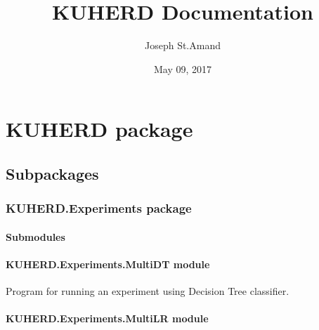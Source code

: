 \documentclass[letterpaper,10pt,english]{sphinxmanual}
\title{KUHERD Documentation}
\date{May 09, 2017}
\author{Joseph St.Amand}
\begin{document}
\maketitle
\sphinxtableofcontents
{}\label{\detokenize{index::doc}}



\chapter{KUHERD package}
\label{\detokenize{KUHERD::doc}}\label{\detokenize{KUHERD:welcome-to-kuherd-s-documentation}}\label{\detokenize{KUHERD:kuherd-package}}

\section{Subpackages}
\label{\detokenize{KUHERD:subpackages}}

\subsection{KUHERD.Experiments package}
\label{\detokenize{KUHERD.Experiments::doc}}\label{\detokenize{KUHERD.Experiments:kuherd-experiments-package}}

\subsubsection{Submodules}
\label{\detokenize{KUHERD.Experiments:submodules}}

\subsubsection{KUHERD.Experiments.MultiDT module}
\label{\detokenize{KUHERD.Experiments:module-KUHERD.Experiments.MultiDT}}\label{\detokenize{KUHERD.Experiments:kuherd-experiments-multidt-module}}

\begin{fulllineitems}
\label{\detokenize{KUHERD.Experiments:KUHERD.Experiments.MultiDT.MultiDT}}
Program for running an experiment using Decision Tree classifier.

\end{fulllineitems}



\subsubsection{KUHERD.Experiments.MultiLR module}
\label{\detokenize{KUHERD.Experiments:module-KUHERD.Experiments.MultiLR}}\label{\detokenize{KUHERD.Experiments:kuherd-experiments-multilr-module}}
\end{document}
